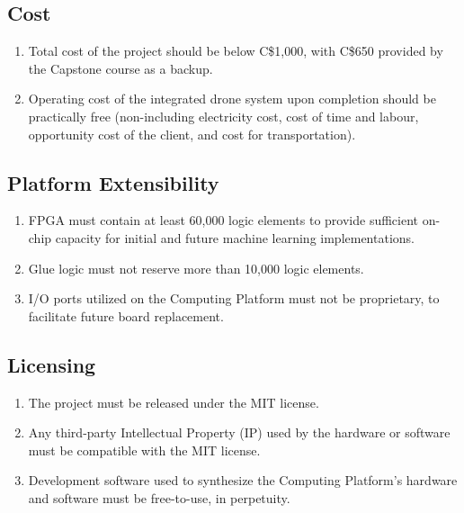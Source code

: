 \documentclass[10pt,letterpaper]{article}
\begin{document}
\subsection{Cost}
\begin{enumerate}[label=C.CT.\arabic*, wide=1cm, widest=3cm, leftmargin=*, font=\bfseries, noitemsep,topsep=0pt, parsep=4pt, partopsep=0pt]
    \item Total cost of the project should be below C\$1,000, with C\$650 provided by the Capstone course as a backup.
    \item Operating cost of the integrated drone system upon completion should be practically free (non-including electricity cost, cost of time and labour, opportunity cost of the client, and cost for transportation).
\end{enumerate}

\subsection{Platform Extensibility}
\begin{enumerate}[label=C.EX.\arabic*, wide=1cm, widest=3cm, leftmargin=*, font=\bfseries, noitemsep,topsep=0pt, parsep=4pt, partopsep=0pt]
    \item FPGA must contain at least 60,000 logic elements to provide sufficient on-chip capacity for initial and future machine learning implementations.
    \item Glue logic must not reserve more than 10,000 logic elements.
    \item I/O ports utilized on the Computing Platform must not be proprietary, to facilitate future board replacement.
\end{enumerate}

\subsection{Licensing}
\begin{enumerate}[label=C.EX.\arabic*, wide=1cm, widest=3cm, leftmargin=*, font=\bfseries, noitemsep,topsep=0pt, parsep=4pt, partopsep=0pt]
    \item The project must be released under the MIT license.
    \item Any third-party Intellectual Property (IP) used by the hardware or software must be compatible with the MIT license.
    \item Development software used to synthesize the Computing Platform's hardware and software must be free-to-use, in perpetuity.
\end{enumerate}
\end{document}
